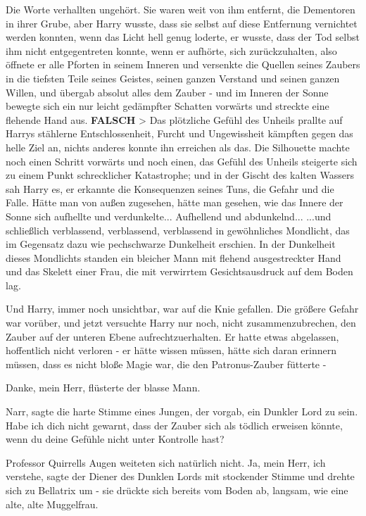 Die Worte verhallten ungehört. Sie waren weit von ihm entfernt, die Dementoren
in ihrer Grube, aber Harry wusste, dass sie selbst auf diese Entfernung
vernichtet werden konnten, wenn das Licht hell genug loderte, er wusste, dass
der Tod selbst ihm nicht entgegentreten konnte, wenn er aufhörte, sich
zurückzuhalten, also öffnete er alle Pforten in seinem Inneren und versenkte die
Quellen seines Zaubers in die tiefsten Teile seines Geistes, seinen ganzen
Verstand und seinen ganzen Willen, und übergab absolut alles dem Zauber - und im
Inneren der Sonne bewegte sich ein nur leicht gedämpfter Schatten vorwärts und
streckte eine flehende Hand aus.
\textbf{FALSCH}    > Das plötzliche
Gefühl des Unheils prallte auf Harrys stählerne Entschlossenheit, Furcht und
Ungewissheit kämpften gegen das helle Ziel an, nichts anderes konnte ihn
erreichen als das. Die Silhouette machte noch einen Schritt vorwärts und noch
einen, das Gefühl des Unheils steigerte sich zu einem Punkt schrecklicher
Katastrophe; und in der Gischt des kalten Wassers sah Harry es, er erkannte die
Konsequenzen seines Tuns, die Gefahr und die Falle. Hätte man von außen
zugesehen, hätte man gesehen, wie das Innere der Sonne sich aufhellte und
verdunkelte... Aufhellend und abdunkelnd... ...und schließlich verblassend,
verblassend, verblassend in gewöhnliches Mondlicht, das im Gegensatz dazu wie
pechschwarze Dunkelheit erschien. In der Dunkelheit dieses Mondlichts standen
ein bleicher Mann mit flehend ausgestreckter Hand und das Skelett einer Frau,
die mit verwirrtem Gesichtsausdruck auf dem Boden lag.

Und Harry, immer noch unsichtbar, war auf die Knie gefallen. Die größere Gefahr
war vorüber, und jetzt versuchte Harry nur noch, nicht zusammenzubrechen, den
Zauber auf der unteren Ebene aufrechtzuerhalten. Er hatte etwas abgelassen,
hoffentlich nicht verloren - er hätte wissen müssen, hätte sich daran erinnern
müssen, dass es nicht bloße Magie war, die den Patronus-Zauber fütterte -

\glqq{}Danke, mein Herr\grqq{}, flüsterte der blasse Mann.

\glqq{}Narr\grqq{}, sagte die harte Stimme eines Jungen, der vorgab, ein Dunkler
Lord zu sein. \glqq{}Habe ich dich nicht gewarnt, dass der Zauber sich als
tödlich erweisen könnte, wenn du deine Gefühle nicht unter Kontrolle hast?\grqq{}

Professor Quirrells Augen weiteten sich natürlich nicht. \glqq{}Ja, mein Herr,
ich verstehe\grqq{}, sagte der Diener des Dunklen Lords mit stockender Stimme
und drehte sich zu Bellatrix um - sie drückte sich bereits vom Boden ab,
langsam, wie eine alte, alte Muggelfrau.

